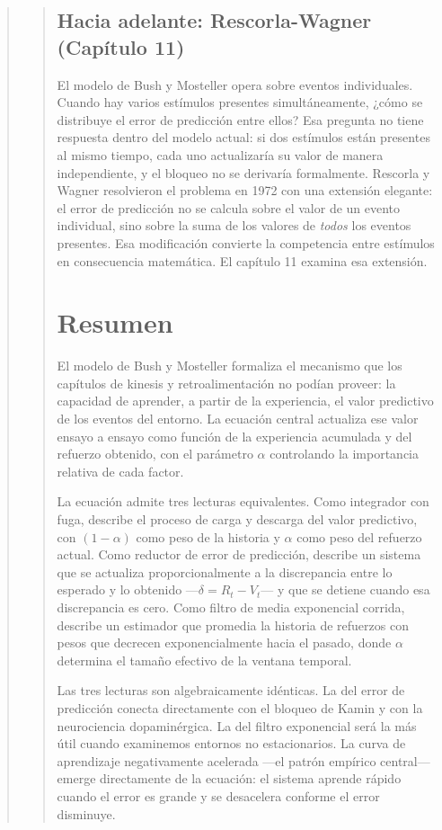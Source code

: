 \documentclass[
  letterpaper,
  DIV=11,
  numbers=noendperiod]{scrreprt}
\begin{document}
\begin{tcolorbox}[enhanced jigsaw, arc=.35mm, bottomrule=.15mm, breakable, colback=white, colframe=quarto-callout-note-color-frame, left=2mm, leftrule=.75mm, opacityback=0, rightrule=.15mm, toprule=.15mm]
\begin{quote}
\begin{quote}
\mbox{}%
\subsection{Hacia adelante: Rescorla-Wagner (Capítulo
11)}\label{hacia-adelante-rescorla-wagner-capuxedtulo-11}

El modelo de Bush y Mosteller opera sobre eventos individuales. Cuando
hay varios estímulos presentes simultáneamente, ¿cómo se distribuye el
error de predicción entre ellos? Esa pregunta no tiene respuesta dentro
del modelo actual: si dos estímulos están presentes al mismo tiempo,
cada uno actualizaría su valor de manera independiente, y el bloqueo no
se derivaría formalmente. Rescorla y Wagner resolvieron el problema en
1972 con una extensión elegante: el error de predicción no se calcula
sobre el valor de un evento individual, sino sobre la suma de los
valores de \emph{todos} los eventos presentes. Esa modificación
convierte la competencia entre estímulos en consecuencia matemática. El
capítulo 11 examina esa extensión.

\mbox{}%
\section{Resumen}\label{resumen-4}

El modelo de Bush y Mosteller formaliza el mecanismo que los capítulos
de kinesis y retroalimentación no podían proveer: la capacidad de
aprender, a partir de la experiencia, el valor predictivo de los eventos
del entorno. La ecuación central actualiza ese valor ensayo a ensayo
como función de la experiencia acumulada y del refuerzo obtenido, con el
parámetro \(\alpha\) controlando la importancia relativa de cada factor.

La ecuación admite tres lecturas equivalentes. Como integrador con fuga,
describe el proceso de carga y descarga del valor predictivo, con
\((1-\alpha)\) como peso de la historia y \(\alpha\) como peso del
refuerzo actual. Como reductor de error de predicción, describe un
sistema que se actualiza proporcionalmente a la discrepancia entre lo
esperado y lo obtenido ---\(\delta = R_t - V_t\)--- y que se detiene
cuando esa discrepancia es cero. Como filtro de media exponencial
corrida, describe un estimador que promedia la historia de refuerzos con
pesos que decrecen exponencialmente hacia el pasado, donde \(\alpha\)
determina el tamaño efectivo de la ventana temporal.

Las tres lecturas son algebraicamente idénticas. La del error de
predicción conecta directamente con el bloqueo de Kamin y con la
neurociencia dopaminérgica. La del filtro exponencial será la más útil
cuando examinemos entornos no estacionarios. La curva de aprendizaje
negativamente acelerada ---el patrón empírico central--- emerge
directamente de la ecuación: el sistema aprende rápido cuando el error
es grande y se desacelera conforme el error disminuye.


\end{quote}
\end{quote}
\end{tcolorbox}
\end{document}
